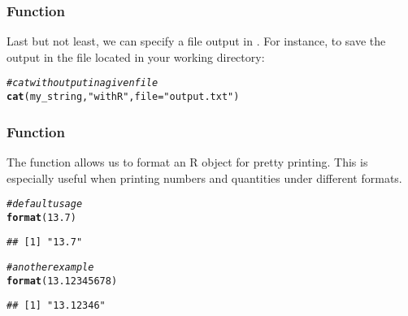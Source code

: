 \documentclass[12pt]{beamer}\usepackage[]{graphicx}\usepackage[]{color}
\makeatletter
\newcommand{\hlnum}[1]{\textcolor[rgb]{0.686,0.059,0.569}{#1}}%
\newcommand{\hlstr}[1]{\textcolor[rgb]{0.192,0.494,0.8}{#1}}%
\newcommand{\hlcom}[1]{\textcolor[rgb]{0.678,0.584,0.686}{\textit{#1}}}%
\newcommand{\hlstd}[1]{\textcolor[rgb]{0.345,0.345,0.345}{#1}}%
\newcommand{\hlkwc}[1]{\textcolor[rgb]{0.333,0.667,0.333}{#1}}%
\newcommand{\hlkwd}[1]{\textcolor[rgb]{0.737,0.353,0.396}{\textbf{#1}}}%
\newenvironment{kframe}{%
 \def\at@end@of@kframe{}%
 \ifinner\ifhmode%
  \def\at@end@of@kframe{\end{minipage}}%
  \begin{minipage}{\columnwidth}%
 \fi\fi%
 \def\FrameCommand##1{\hskip\@totalleftmargin \hskip-\fboxsep
 \colorbox{shadecolor}{##1}\hskip-\fboxsep
     \hskip-\linewidth \hskip-\@totalleftmargin \hskip\columnwidth}%
 \MakeFramed {\advance\hsize-\width
   \@totalleftmargin\z@ \linewidth\hsize
   \@setminipage}}%
 {\par\unskip\endMakeFramed%
 \at@end@of@kframe}
\newenvironment{knitrout}{}{} %
\makeatother
\begin{document}
\begin{frame}[fragile]
\frametitle{Function }

Last but not least, we can specify a file output in . For instance, to save the output in the file  located in your working directory:
\begin{knitrout}\footnotesize
{}\color{fgcolor}\begin{kframe}
\begin{alltt}
\hlcom{# cat with output in a given file}
\hlkwd{cat}\hlstd{(my_string,} \hlstr{"with R"}\hlstd{,} \hlkwc{file} \hlstd{=} \hlstr{"output.txt"}\hlstd{)}
\end{alltt}
\end{kframe}
\end{knitrout}

\end{frame}


\begin{frame}[fragile]
\frametitle{Function }

The function  allows us to format an R object for pretty printing. This is especially useful when printing numbers and quantities under different formats.
\begin{knitrout}\footnotesize
{}\color{fgcolor}\begin{kframe}
\begin{alltt}
\hlcom{# default usage}
\hlkwd{format}\hlstd{(}\hlnum{13.7}\hlstd{)}
\end{alltt}
\begin{verbatim}
## [1] "13.7"
\end{verbatim}
\begin{alltt}
\hlcom{# another example}
\hlkwd{format}\hlstd{(}\hlnum{13.12345678}\hlstd{)}
\end{alltt}
\begin{verbatim}
## [1] "13.12346"
\end{verbatim}
\end{kframe}
\end{knitrout}

\end{frame}

\end{document}
